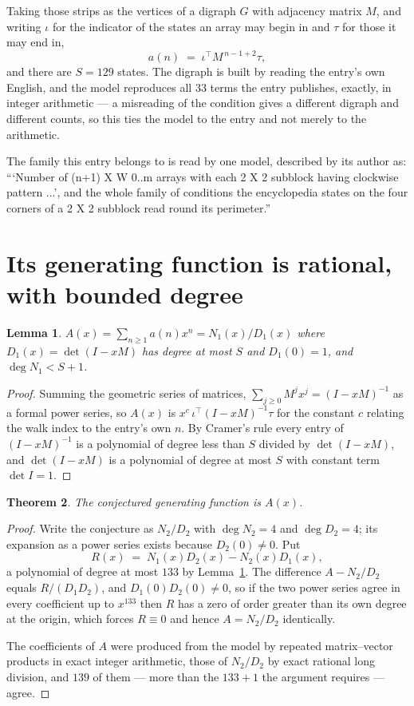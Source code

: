 \documentclass[11pt,a4paper]{article}
\theoremstyle{plain}
\newtheorem{theorem}{Theorem}
\newtheorem{lemma}[theorem]{Lemma}
\theoremstyle{definition}
\begin{document}
Taking those strips as the vertices of a digraph $G$ with adjacency matrix $M$, and writing
$\iota$ for the indicator of the states an array may begin in and $\tau$ for those it may end
in,
\[
a(n)\;=\;\iota^{\!\top}M^{\,n-1+2}\tau ,
\]
and there are $S=129$ states. The digraph is built by reading the entry's own English, and the
model reproduces all $33$ terms the entry publishes, exactly, in integer arithmetic --- a
misreading of the condition gives a different digraph and different counts, so this ties the
model to the entry and not merely to the arithmetic.

The family this entry belongs to is read by one model, described by its author as: ```Number of (n+1) X W 0..m arrays with each 2 X 2 subblock having clockwise pattern ...', and the whole family of conditions the encyclopedia states on the four corners of a 2 X 2 subblock read round its perimeter.''


\section{Its generating function is rational, with bounded degree}

\begin{lemma}\label{lem:rat}
$A(x)=\sum_{n\ge1}a(n)x^n=N_1(x)/D_1(x)$ where $D_1(x)=\det(I-xM)$ has degree at most
$S$ and $D_1(0)=1$, and $\deg N_1<S+1$.
\end{lemma}

\begin{proof}
Summing the geometric series of matrices, $\sum_{j\ge0}M^jx^j=(I-xM)^{-1}$ as a formal
power series, so $A(x)$ is $x^{c}\,\iota^{\!\top}(I-xM)^{-1}\tau$ for the constant $c$
relating the walk index to the entry's own $n$. By Cramer's rule every entry of
$(I-xM)^{-1}$ is a polynomial of degree less than $S$ divided by $\det(I-xM)$, and
$\det(I-xM)$ is a polynomial of degree at most $S$ with constant term $\det I=1$.
\end{proof}

\begin{theorem}
The conjectured generating function is $A(x)$.
\end{theorem}

\begin{proof}
Write the conjecture as $N_2/D_2$ with $\deg N_2=4$ and $\deg D_2=4$; its expansion as a
power series exists because $D_2(0)\neq0$. Put
\[
R(x)\;=\;N_1(x)D_2(x)-N_2(x)D_1(x),
\]
a polynomial of degree at most $133$ by Lemma~\ref{lem:rat}. The difference
$A-N_2/D_2$ equals $R/(D_1D_2)$, and $D_1(0)D_2(0)\neq0$, so if the two power series agree in
every coefficient up to $x^{133}$ then $R$ has a zero of order greater than its own
degree at the origin, which forces $R\equiv0$ and hence $A=N_2/D_2$ identically.

The coefficients of $A$ were produced from the model by repeated matrix--vector products in
exact integer arithmetic, those of $N_2/D_2$ by exact rational long division, and $139$
of them --- more than the $133+1$ the argument requires --- agree.
\end{proof}
\end{document}
